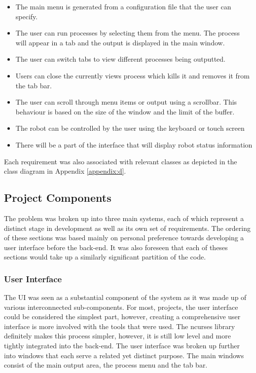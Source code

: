\begin{itemize}
  \item The main menu is generated from a configuration file that the user can specify.
  \item The user can run processes by selecting them from the menu. The process will appear in a tab and the output is displayed in the main window.
  \item The user can switch tabs to view different processes being outputted.
  \item Users can close the currently views process which kills it and removes it from the tab bar.
  \item The user can scroll through menu items or output using a scrollbar. This behaviour is based on the size of the window and the limit of the buffer.
  \item The robot can be controlled by the user using the keyboard or touch screen
  \item There will be a part of the interface that will display robot status information
\end{itemize}

Each requirement was also associated with relevant classes as depicted in the class diagram in Appendix \ref{appendix:d}.

\subsection{Project Components}

The problem was broken up into three main systems, each of which represent a distinct stage in development as well as its own set of requirements. The ordering of these sections was based mainly on personal preference towards developing a user interface before the back-end. It was also foreseen that each of theses sections would take up a similarly significant partition of the code.

\subsubsection{User Interface}

The UI was seen as a substantial component of the system as it was made up of various interconnected sub-components. For most, projects, the user interface could be considered the simplest part, however, creating a comprehensive user interface is more involved with the tools that were used. The {\selectfont ncurses} library definitely makes this process simpler, however, it is still low level and more tightly integrated into the back-end. The user interface was broken up further into windows that each serve a related yet distinct purpose. The main windows consist of the main output area, the process menu and the tab bar.

